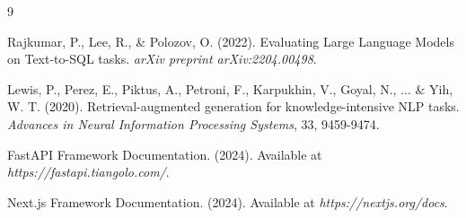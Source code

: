 \documentclass[12pt]{article}
\begin{document}
\newpage
  

\begin{thebibliography}{9}

Rajkumar, P., Lee, R., \& Polozov, O. (2022). 
Evaluating Large Language Models on Text-to-SQL tasks. 
\textit{arXiv preprint arXiv:2204.00498}.

Lewis, P., Perez, E., Piktus, A., Petroni, F., Karpukhin, V., Goyal, N., ... \& Yih, W. T. (2020). 
Retrieval-augmented generation for knowledge-intensive NLP tasks. 
\textit{Advances in Neural Information Processing Systems}, 33, 9459-9474.

FastAPI Framework Documentation. (2024). 
Available at \textit{https://fastapi.tiangolo.com/}.

Next.js Framework Documentation. (2024). 
Available at \textit{https://nextjs.org/docs}.

\end{thebibliography}
\end{document}
